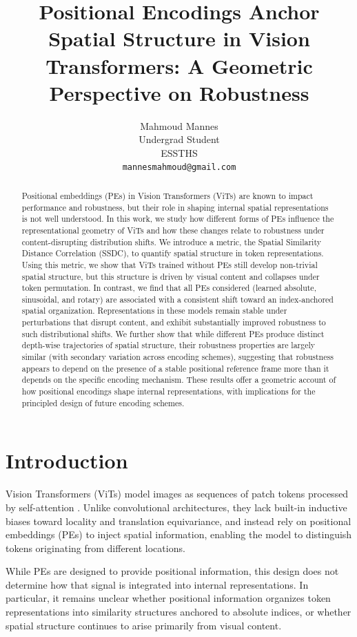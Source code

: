 \documentclass{article}
\title{Positional Encodings Anchor Spatial Structure in Vision Transformers: A Geometric Perspective on Robustness}
\author{%
  Mahmoud Mannes \\
  Undergrad Student\\
  ESSTHS\\
  \texttt{mannesmahmoud@gmail.com} \\
}
\begin{document}
\maketitle


\begin{abstract}
Positional embeddings (PEs) in Vision Transformers (ViTs) are known to impact performance and robustness, but their role in shaping internal spatial representations is not well understood. In this work, we study how different forms of PEs influence the representational geometry of ViTs and how these changes relate to robustness under content-disrupting distribution shifts.
We introduce a metric, the Spatial Similarity Distance Correlation (SSDC), to quantify spatial structure in token representations. Using this metric, we show that ViTs trained without PEs still develop non-trivial spatial structure, but this structure is driven by visual content and collapses under token permutation.
In contrast, we find that all PEs considered (learned absolute, sinusoidal, and rotary) are associated with a consistent shift toward an index-anchored spatial organization. Representations in these models remain stable under perturbations that disrupt content, and exhibit substantially improved robustness to such distributional shifts.
We further show that while different PEs produce distinct depth-wise trajectories of spatial structure, their robustness properties are largely similar (with secondary variation across encoding schemes), suggesting that robustness appears to depend on the presence of a stable positional reference frame more than it depends on the specific encoding mechanism.
These results offer a geometric account of how positional encodings shape internal representations, with implications for the principled design of future encoding schemes.
\end{abstract}

\section{Introduction}
Vision Transformers (ViTs) model images as sequences of patch tokens processed by self-attention \citep{dosovitskiy2021an}. Unlike convolutional architectures, they lack built-in inductive biases toward locality and translation equivariance, and instead rely on positional embeddings (PEs) to inject spatial information, enabling the model to distinguish tokens originating from different locations.

While PEs are designed to provide positional information, this design does not determine how that signal is integrated into internal representations. In particular, it remains unclear whether positional information organizes token representations into similarity structures anchored to absolute indices, or whether spatial structure continues to arise primarily from visual content.
\end{document}
